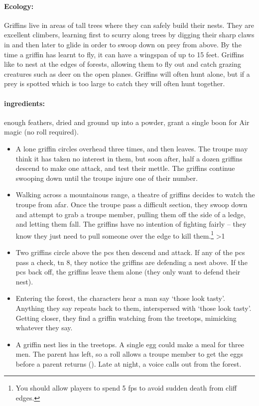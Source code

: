 \begin{multicols}{2}

\paragraph{Ecology:} Griffins live in areas of tall trees where they can safely build their nests.
They are excellent climbers, learning first to scurry along trees by digging their sharp claws in and then later to glide in order to swoop down on prey from above.
By the time a griffin has learnt to fly, it can have a wingspan of up to 15 feet.
Griffins like to nest at the edges of forests, allowing them to fly out and catch grazing creatures such as deer on the open planes.
Griffins will often hunt alone, but if a prey is spotted which is too large to catch  they will often hunt together.

\paragraph{\Glspl{ingredient}:}
enough feathers, dried and ground up into a powder, grant a single \gls{boon} for Air magic (no roll required).

\showEnc

\begin{itemize}
  \item
  A lone griffin circles overhead three times, and then leaves.
  The troupe may think it has taken no interest in them, but soon after, half a dozen griffins descend to make one attack, and test their mettle.
  The griffins continue swooping down until the troupe injure one of their number.
  \item
  Walking across a mountainous range, a theatre of griffins decides to watch the troupe from afar.
  Once the troupe pass a difficult section, they swoop down and attempt to grab a troupe member, pulling them off the side of a ledge, and letting them fall.
  The griffins have no intention of fighting fairly -- they know they just need to pull someone over the edge to kill them.\footnote{You should allow players to spend 5 \glspl{fp} to avoid sudden death from cliff edges.}
  \ifnum\value{temperature}>1
    \item
    Two griffins circle above the \glspl{pc} then descend and attack.
    If any of the \glspl{pc} pass a  check, \gls{tn} 8, they notice the griffins are defending a nest above.
    If the \glspl{pc} back off, the griffins leave them alone (they only want to defend their nest).
  \else
    \item
    Entering the forest, the characters hear a man say `those look tasty'.
    Anything they say repeats back to them, interspersed with `those look tasty'.
    Getting closer, they find a griffin watching from the treetops, mimicking whatever they say.
  \fi
  \item
  \ifodd\value{r4}
    A griffin nest lies in the treetops.
    A single egg could make a meal for three men.
    The parent has left, so a  roll allows a troupe member to get the eggs before a parent returns (\tn[9]).
  \else
    Late at night, a voice calls out from the forest.


\end{itemize}
\end{multicols}
